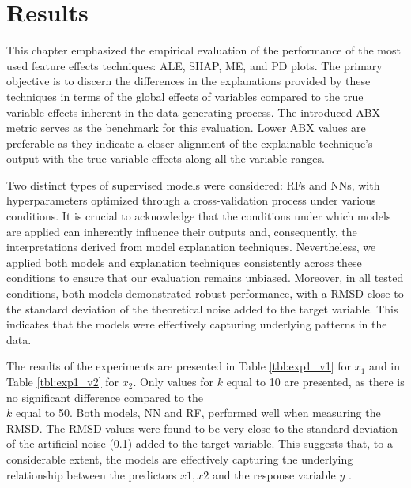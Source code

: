 \section{Results}

This chapter emphasized the empirical evaluation of the performance of the most used feature effects techniques: \gls{ALE}, \gls{SHAP}, \gls{ME}, and \gls{PD} plots. The primary objective is to discern the differences in the explanations provided by these techniques in terms of the global effects of variables compared to the true variable effects inherent in the data-generating process. The introduced \gls{ABX} metric serves as the benchmark for this evaluation. Lower \gls{ABX} values are preferable as they indicate a closer alignment of the explainable technique's output with the true variable effects along all the variable ranges.

Two distinct types of supervised models were considered: \gls{RF}s and \gls{NN}s, with hyperparameters optimized through a cross-validation process under various conditions. It is crucial to acknowledge that the conditions under which models are applied can inherently influence their outputs and, consequently, the interpretations derived from model explanation techniques. Nevertheless, we applied both models and explanation techniques consistently across these conditions to ensure that our evaluation remains unbiased. Moreover, in all tested conditions, both models demonstrated robust performance, with a \gls{RMSD} close to the standard deviation of the theoretical noise added to the target variable. This indicates that the models were effectively capturing underlying patterns in the data.

The results of the experiments are presented in Table \ref{tbl:exp1_v1} for $x_1$ and in Table \ref{tbl:exp1_v2} for $x_2$. Only values for \(k\) equal to 10 are presented, as there is no significant difference compared to the \\\(k\) equal to 50. Both models, \gls{NN} and \gls{RF}, performed well when measuring the \gls{RMSD}. The \gls{RMSD} values were found to be very close to the standard deviation of the artificial noise (0.1) added to the target variable. This suggests that, to a considerable extent, the models are effectively capturing the underlying relationship between the predictors \(x1, x2\) and the response variable \(y\) . 



